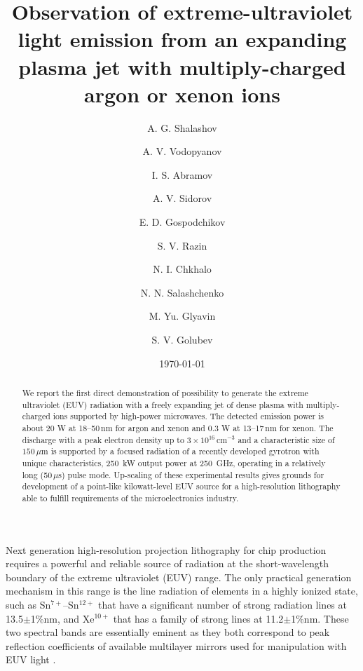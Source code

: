 \documentclass[aip, apl, amsmath,amssymb, reprint]{revtex4-1}
\def\uband{13.5$\pm$1\%\;nm\;}
\def\eband{11.2$\pm$1\%\;nm\;}
\begin{document}
\title[]{Observation of extreme-ultraviolet light emission from an expanding plasma jet with multiply-charged argon or xenon ions}
\author{A. G. Shalashov}
\author{A. V. Vodopyanov}
\author{I. S. Abramov}
\author{A. V. Sidorov}
\author{E. D. Gospodchikov}
\author{S. V. Razin}
\author{N. I. Chkhalo}
\author{N. N. Salashchenko}
\author{M. Yu. Glyavin}\author{S. V. Golubev}
\date{\today}

\begin{abstract}

We report the first direct demonstration of possibility to generate the extreme ultraviolet (EUV) radiation with a freely expanding jet of dense plasma with multiply-charged ions supported by high-power microwaves. The detected emission power is about 20 W at 18--50\,nm for argon and xenon and 0.3 W at 13--17\,nm for xenon. The discharge with a peak electron density up to $3\times 10^{16}\,$cm$^{-3}$ and a characteristic size of $150\,\mu$m is supported by a focused radiation of a recently developed gyrotron with unique characteristics, 250~kW output power at 250~GHz, operating in a relatively long (50$\,\mu$s) pulse mode.
Up-scaling of these experimental results gives grounds for development of a point-like kilowatt-level EUV source for a high-resolution lithography able to fulfill requirements of the microelectronics industry.
\end{abstract}


\maketitle

Next generation high-resolution projection lithography for chip production requires a powerful and reliable source of radiation at the short-wavelength boundary of the extreme ultraviolet (EUV) range\cite{bakshi_2006,wagner_2010,moore}. The only practical generation mechanism in this range is the line radiation of elements in a highly ionized state, such as Sn$^{7+}$--Sn$^{12+}$ that have a significant number of strong radiation lines at \uband \cite{churilov_2003}, and Xe$^{10+}$ that has a family of strong lines at \eband \cite{churilov_2002,churilov_2004,saloman_2004}. These two spectral bands are essentially eminent as they both correspond to peak reflection coefficients of available multilayer mirrors used for manipulation with EUV light \cite{ckhalo_adv_2013}. 
\end{document}
